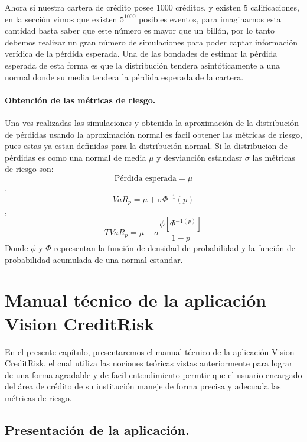 \documentclass[
  12pt,
]{krantz}
\theoremstyle{definition}
\theoremstyle{definition}
\theoremstyle{definition}
\theoremstyle{remark}
\begin{document}
Ahora si nuestra cartera de crédito posee 1000 créditos, y existen 5 calificaciones, en la sección vimos que existen \(5^{1000}\) posibles eventos, para imaginarnos esta cantidad basta saber que este número es mayor que un billón, por lo tanto debemos realizar un gran número de simulaciones para poder captar información verídica de la pérdida esperada. Una de las bondades de estimar la pérdida esperada de esta forma es que la distribución tendera asintóticamente a una normal donde su media tendera la pérdida esperada de la cartera.

\hypertarget{obtencion-de-las-metricas-de-riesgo.}{%
\subsubsection{Obtención de las métricas de riesgo.}\label{obtencion-de-las-metricas-de-riesgo.}}

Una ves realizadas las simulaciones y obtenida la aproximación de la distribución de pérdidas usando la aproximación normal es facil obtener las métricas de riesgo, pues estas ya estan definidas para la distribución normal. Si la distribucion de pérdidas es como una normal de media \(\mu\) y desvianción estandasr \(\sigma\) las métricas de riesgo son: \[\textrm{Pérdida esperada}=\mu\],\[VaR_{p}=\mu+\sigma\Phi^{-1}(p)\],\[TVaR_p=\mu+\sigma\frac{\phi[\Phi^{-1(p)}]}{1-p}\]
Donde \(\phi\) y \(\Phi\) representan la función de densidad de probabilidad y la función de probabilidad acumulada de una normal estandar.

\mainmatter

\hypertarget{manual-tecnico-de-la-aplicacion-vision-creditrisk}{%
\chapter{Manual técnico de la aplicación Vision CreditRisk}\label{manual-tecnico-de-la-aplicacion-vision-creditrisk}}

En el presente capítulo, presentaremos el manual técnico de la aplicación Vision CreditRisk, el cual utiliza las nociones teóricas vistas anteriormente para lograr de una forma agradable y de facil entendimiento permtir que el usuario encargado del área de crédito de su institución maneje de forma precisa y adecuada las métricas de riesgo.

\hypertarget{presentacion-de-la-aplicacion.}{%
\section{Presentación de la aplicación.}\label{presentacion-de-la-aplicacion.}}
\end{document}
